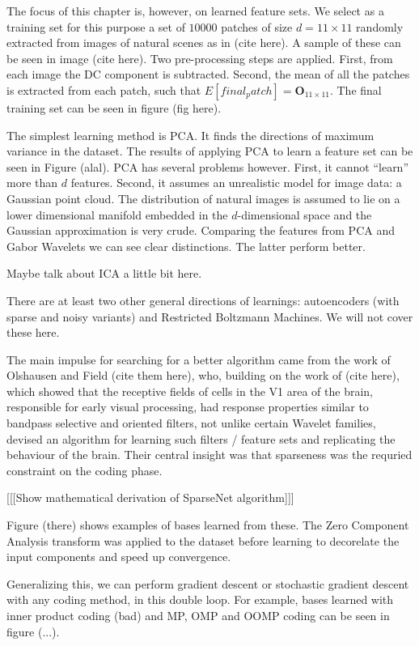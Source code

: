 \documentclass[12pt,a4paper,oneside,english]{UPBThesis}
\newcommand{\hctimes}[2]{{#1}\!\times\!{#2}}
\begin{document}
The focus of this chapter is, however, on learned feature sets. We select as a training set for this purpose a set of $10000$ patches of size $d = \hctimes{11}{11}$ randomly extracted from images of natural scenes as in (cite here). A sample of these can be seen in image (cite here). Two pre-processing steps are applied. First, from each image the DC component is subtracted. Second, the mean of all the patches is extracted from each patch, such that $E[final_patch] = \textbf{O}_{\hctimes{11}{11}}$. The final training set can be seen in figure (fig here).

The simplest learning method is PCA. It finds the directions of maximum variance in the dataset. The results of applying PCA to learn a feature set can be seen in Figure (alal). PCA has several problems however. First, it cannot ``learn'' more than $d$ features. Second, it assumes an unrealistic model for image data: a Gaussian point cloud. The distribution of natural images is assumed to lie on a lower dimensional manifold embedded in the $d$-dimensional space and the Gaussian approximation is very crude. Comparing the features from PCA and Gabor Wavelets we can see clear distinctions. The latter perform better.

Maybe talk about ICA a little bit here.

There are at least two other general directions of learnings: autoencoders (with sparse and noisy variants) and Restricted Boltzmann Machines. We will not cover these here.

The main impulse for searching for a better algorithm came from the work of Olshausen and Field (cite them here), who, building on the work of (cite here), which showed that the receptive fields of cells in the V1 area of the brain, responsible for early visual processing, had response properties similar to bandpass selective and oriented filters, not unlike certain Wavelet families, devised an algorithm for learning such filters / feature sets and replicating the behaviour of the brain. Their central insight was that sparseness was the requried constraint on the coding phase.

[[[Show mathematical derivation of SparseNet algorithm]]]

Figure (there) shows examples of bases learned from these. The Zero Component Analysis transform was applied to the dataset before learning to decorelate the input components and speed up convergence.

Generalizing this, we can perform gradient descent or stochastic gradient descent with any coding method, in this double loop. For example, bases learned with inner product coding (bad) and MP, OMP and OOMP coding can be seen in figure (...).
\end{document}
